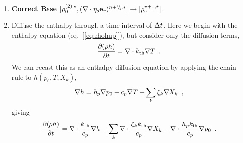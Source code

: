 \begin{description}
\begin{enumerate}
\item {\bf Correct Base}
$[\rho_0^{(2),\star}, (\nabla\cdot\etarho\er)^{\nph,*}] \rightarrow [\rho_0^{n+1,\star}]$.



\item Diffuse the enthalpy through a time interval of $\Delta t$.  Here we begin
with the enthalpy equation (eq.~[\ref{eq:rhohup}]), but consider only the 
diffusion terms,
\begin{equation}
  \frac{\partial (\rho h)}{\partial t}  = 
 \nabla\cdot k_{\rm th}\nabla T 
\enskip . \label{eq:rhohupdthermal} 
  \end{equation}
We can recast this as an enthalpy-diffusion equation by applying the
chain-rule to $h(p_0,T,X_k)$,
\begin{equation}
\nabla h = h_p \nabla p_0 + c_p \nabla T + \sum_k \xi_k \nabla X_k \enskip ,
\end{equation}
giving
\begin{equation}
  \frac{\partial (\rho h)}{\partial t}  = 
 \nabla\cdot \frac{k_{\rm th}}{c_p}\nabla h -  
 \sum_k \nabla\cdot \frac{\xi_k k_{\rm th}}{c_p}\nabla X_k -
 \nabla\cdot \frac{h_p k_{\rm th}}{c_p}\nabla p_0 
\enskip . \label{eq:rhohupdthermal2} 
  \end{equation}



\end{enumerate}
\end{description}
